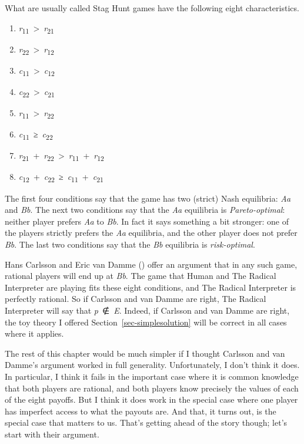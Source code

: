 \documentclass[
  10pt,
  letterpaper,
  twoside]{scrbook}
\providecommand{\tightlist}{%
  \setlength{\itemsep}{0pt}\setlength{\parskip}{0pt}}\usepackage{longtable,booktabs,array}
\begin{document}
What are usually called Stag Hunt games have the following eight
characteristics.

\begin{enumerate}
\def\labelenumi{\arabic{enumi}.}
\tightlist
\item
  \emph{r}\textsubscript{11}~\textgreater~\emph{r}\textsubscript{21}
\item
  \emph{r}\textsubscript{22}~\textgreater~\emph{r}\textsubscript{12}
\item
  \emph{c}\textsubscript{11}~\textgreater~\emph{c}\textsubscript{12}
\item
  \emph{c}\textsubscript{22}~\textgreater~\emph{c}\textsubscript{21}
\item
  \emph{r}\textsubscript{11}~\textgreater~\emph{r}\textsubscript{22}
\item
  \emph{c}\textsubscript{11}~≥~\emph{c}\textsubscript{22}
\item
  \emph{r}\textsubscript{21}~+~\emph{r}\textsubscript{22}~\textgreater~\emph{r}\textsubscript{11}~+~\emph{r}\textsubscript{12}
\item
  \emph{c}\textsubscript{12}~+~\emph{c}\textsubscript{22}~≥~\emph{c}\textsubscript{11}~+~\emph{c}\textsubscript{21}
\end{enumerate}

The first four conditions say that the game has two (strict) Nash
equilibria: \emph{Aa} and \emph{Bb}. The next two conditions say that
the \emph{Aa} equilibria is \emph{Pareto-optimal}: neither player
prefers \emph{Aa} to \emph{Bb}. In fact it says something a bit
stronger: one of the players strictly prefers the \emph{Aa} equilibria,
and the other player does not prefer \emph{Bb}. The last two conditions
say that the \emph{Bb} equilibria is \emph{risk-optimal}.

Hans Carlsson and Eric van Damme
() offer an argument that in
any such game, rational players will end up at \emph{Bb}. The game that
Human and The Radical Interpreter are playing fits these eight
conditions, and The Radical Interpreter is perfectly rational. So if
Carlsson and van Damme are right, The Radical Interpreter will say that
\emph{p}~∉~\emph{E}. Indeed, if Carlsson and van Damme are right, the
toy theory I offered Section~\ref{sec-simplesolution} will be correct in
all cases where it applies.

The rest of this chapter would be much simpler if I thought Carlsson and
van Damme's argument worked in full generality. Unfortunately, I don't
think it does. In particular, I think it fails in the important case
where it is common knowledge that both players are rational, and both
players know precisely the values of each of the eight payoffs. But I
think it does work in the special case where one player has imperfect
access to what the payouts are. And that, it turns out, is the special
case that matters to us. That's getting ahead of the story though; let's
start with their argument.
\end{document}
